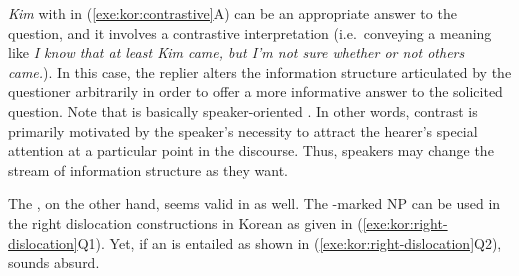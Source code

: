 


\noindent \textit{Kim} with \nun in (\ref{exe:kor:contrastive}A) can
be an appropriate answer to the question, and it involves a
contrastive interpretation (i.e.\ conveying a meaning like \textit{I
  know that at least Kim came, but I'm not sure whether or not others
  came.}).  In this case, the replier alters the information
structure articulated by the questioner arbitrarily in order to offer
a more informative answer to the solicited question. Note that
 is basically speaker-oriented \citep{chang:02}. In
other words, contrast is primarily motivated by the speaker's
necessity to attract the hearer's special attention at a particular
point in the discourse. Thus, speakers may change the stream of
information structure as they want.
	
The , on the other hand, seems valid in
 as well. The \onun-marked NP can be used in the right
dislocation constructions in Korean as given in
(\ref{exe:kor:right-dislocation}Q1). Yet, if an  is
entailed as shown in (\ref{exe:kor:right-dislocation}Q2), 
 sounds absurd.



